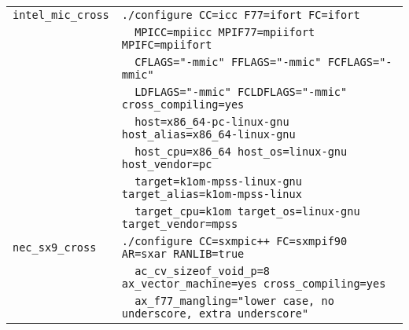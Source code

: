 \documentclass[a4paper]{article}
\begin{document}
\begin{table}[htbp]
\begin{center}
\begin{tabular}{|l|l|}
\verb+intel_mic_cross+    & \verb+./configure CC=icc F77=ifort FC=ifort+ \\
                          & \verb+  MPICC=mpiicc MPIF77=mpiifort MPIFC=mpiifort+ \\
                          & \verb+  CFLAGS="-mmic" FFLAGS="-mmic" FCFLAGS="-mmic"+ \\
                          & \verb+  LDFLAGS="-mmic" FCLDFLAGS="-mmic" cross_compiling=yes+ \\
                          & \verb+  host=x86_64-pc-linux-gnu host_alias=x86_64-linux-gnu+ \\
                          & \verb+  host_cpu=x86_64 host_os=linux-gnu host_vendor=pc+ \\
                          & \verb+  target=k1om-mpss-linux-gnu target_alias=k1om-mpss-linux+ \\
                          & \verb+  target_cpu=k1om target_os=linux-gnu target_vendor=mpss+ \\
\hline
\verb+nec_sx9_cross+      & \verb|./configure CC=sxmpic++ FC=sxmpif90 AR=sxar RANLIB=true | \\
                          & \verb+  ac_cv_sizeof_void_p=8 ax_vector_machine=yes cross_compiling=yes+ \\ 
                          & \verb+  ax_f77_mangling="lower case, no underscore, extra underscore"+ \\ \hline
\end{tabular}
\end{center}
\end{table}
\end{document}
